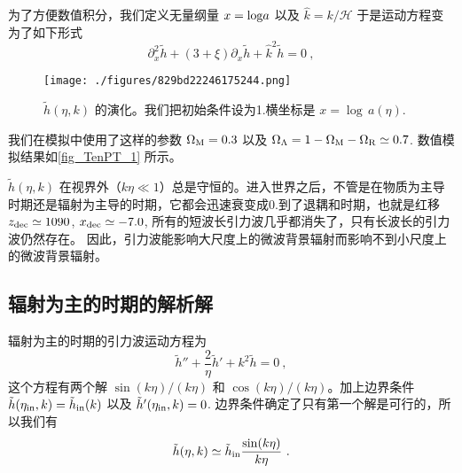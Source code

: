 为了方便数值积分，我们定义无量纲量 $x = {\rm log} a$ 以及 $\hat k = k/\mathcal H$ 于是运动方程变为了如下形式
\begin{equation}
\partial^2_x \tilde h + (3+\xi) \partial_x \tilde h + \hat k^2 \tilde h = 0 ~,
\end{equation}
\begin{figure}[ht]
\centering
\texttt{[image: ./figures/829bd22246175244.png]}
\caption{$\tilde h(\eta,k)$ 的演化。我们把初始条件设为1.横坐标是 $x = {\log} \, a (\eta).$} \label{fig_TenPT_1}
\end{figure}
我们在模拟中使用了这样的参数 $\Omega_{\rm M}=0.3$ 以及 $\Omega_{\Lambda} = 1 - \Omega_{\rm M} - \Omega_{\rm R} \simeq 0.7$. 数值模拟结果如\autoref{fig_TenPT_1} 所示。

$\tilde h(\eta,k)$ 在视界外（$k\eta\ll 1$）总是守恒的。进入世界之后，不管是在物质为主导时期还是辐射为主导的时期，它都会迅速衰变成0.到了退耦和时期，也就是红移 $z_{\rm dec} \simeq 1090$, $x_{\rm dec}\simeq -7.0$, 所有的短波长引力波几乎都消失了，只有长波长的引力波仍然存在。 因此，引力波能影响大尺度上的微波背景辐射而影响不到小尺度上的微波背景辐射。

\subsection{辐射为主的时期的解析解}
辐射为主的时期的引力波运动方程为
\begin{equation}
\tilde h'' + \frac{2}{\eta} \tilde h' + k^2 \tilde h = 0~,
\end{equation}
这个方程有两个解 $\sin(k\eta)/(k\eta)$ 和 $\cos(k\eta)/(k\eta)$。加上边界条件 $\tilde h(\eta_{\rm in},k) = \tilde h_{\rm in} (k)$ 以及 $\tilde h'(\eta_{\rm in},k) = 0$. 边界条件确定了只有第一个解是可行的，所以我们有
\begin{equation}
\tilde h (\eta, k) \simeq \tilde h_{\rm in} \frac{\sin(k\eta)}{k\eta} ~.
\end{equation}

